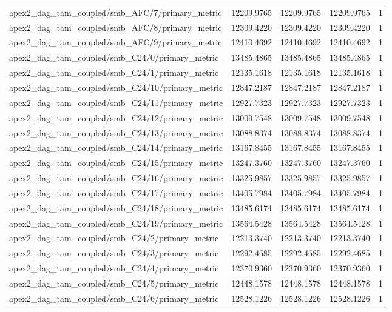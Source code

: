 \begin{table}[h]
\begin{tabular}{lrrrr}
apex2_dag_tam_coupled/smb_AFC/7/primary_metric & 12209.9765 & 12209.9765 & 12209.9765 & 1 \\
apex2_dag_tam_coupled/smb_AFC/8/primary_metric & 12309.4220 & 12309.4220 & 12309.4220 & 1 \\
apex2_dag_tam_coupled/smb_AFC/9/primary_metric & 12410.4692 & 12410.4692 & 12410.4692 & 1 \\
apex2_dag_tam_coupled/smb_C24/0/primary_metric & 13485.4865 & 13485.4865 & 13485.4865 & 1 \\
apex2_dag_tam_coupled/smb_C24/1/primary_metric & 12135.1618 & 12135.1618 & 12135.1618 & 1 \\
apex2_dag_tam_coupled/smb_C24/10/primary_metric & 12847.2187 & 12847.2187 & 12847.2187 & 1 \\
apex2_dag_tam_coupled/smb_C24/11/primary_metric & 12927.7323 & 12927.7323 & 12927.7323 & 1 \\
apex2_dag_tam_coupled/smb_C24/12/primary_metric & 13009.7548 & 13009.7548 & 13009.7548 & 1 \\
apex2_dag_tam_coupled/smb_C24/13/primary_metric & 13088.8374 & 13088.8374 & 13088.8374 & 1 \\
apex2_dag_tam_coupled/smb_C24/14/primary_metric & 13167.8455 & 13167.8455 & 13167.8455 & 1 \\
apex2_dag_tam_coupled/smb_C24/15/primary_metric & 13247.3760 & 13247.3760 & 13247.3760 & 1 \\
apex2_dag_tam_coupled/smb_C24/16/primary_metric & 13325.9857 & 13325.9857 & 13325.9857 & 1 \\
apex2_dag_tam_coupled/smb_C24/17/primary_metric & 13405.7984 & 13405.7984 & 13405.7984 & 1 \\
apex2_dag_tam_coupled/smb_C24/18/primary_metric & 13485.6174 & 13485.6174 & 13485.6174 & 1 \\
apex2_dag_tam_coupled/smb_C24/19/primary_metric & 13564.5428 & 13564.5428 & 13564.5428 & 1 \\
apex2_dag_tam_coupled/smb_C24/2/primary_metric & 12213.3740 & 12213.3740 & 12213.3740 & 1 \\
apex2_dag_tam_coupled/smb_C24/3/primary_metric & 12292.4685 & 12292.4685 & 12292.4685 & 1 \\
apex2_dag_tam_coupled/smb_C24/4/primary_metric & 12370.9360 & 12370.9360 & 12370.9360 & 1 \\
apex2_dag_tam_coupled/smb_C24/5/primary_metric & 12448.1578 & 12448.1578 & 12448.1578 & 1 \\
apex2_dag_tam_coupled/smb_C24/6/primary_metric & 12528.1226 & 12528.1226 & 12528.1226 & 1 \\

\end{tabular}
\end{table}
